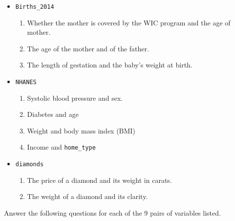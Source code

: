 \documentclass[nofonts,]{tufte-handout}
\providecommand{\tightlist}{%
  \setlength{\itemsep}{0pt}\setlength{\parskip}{0pt}}
\begin{document}
\begin{itemize}
\tightlist
\item
  \texttt{Births\_2014}

  \begin{enumerate}
  \def\labelenumi{\arabic{enumi}.}
  \tightlist
  \item
    Whether the mother is covered by the WIC program and the age of
    mother.
  \item
    The age of the mother and of the father.
  \item
    The length of gestation and the baby's weight at birth.
  \end{enumerate}
\item
  \texttt{NHANES}

  \begin{enumerate}
  \def\labelenumi{\arabic{enumi}.}
  \setcounter{enumi}{3}
  \tightlist
  \item
    Systolic blood pressure and sex.
  \item
    Diabetes and age
  \item
    Weight and body mass index (BMI)
  \item
    Income and \texttt{home\_type}
  \end{enumerate}
\item
  \texttt{diamonds}

  \begin{enumerate}
  \def\labelenumi{\arabic{enumi}.}
  \setcounter{enumi}{7}
  \tightlist
  \item
    The price of a diamond and its weight in carats.
  \item
    The weight of a diamond and its clarity.
  \end{enumerate}
\end{itemize}

Answer the following questions for each of the 9 pairs of variables
listed.
\end{document}
